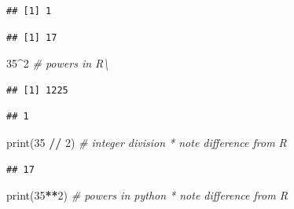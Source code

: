 \documentclass[]{book}
\newenvironment{Shaded}{\begin{snugshade}}{\end{snugshade}}
\newcommand{\DecValTok}[1]{\textcolor[rgb]{0.00,0.00,0.81}{#1}}
\newcommand{\StringTok}[1]{\textcolor[rgb]{0.31,0.60,0.02}{#1}}
\newcommand{\CommentTok}[1]{\textcolor[rgb]{0.56,0.35,0.01}{\textit{#1}}}
\newcommand{\OperatorTok}[1]{\textcolor[rgb]{0.81,0.36,0.00}{\textbf{#1}}}
\newcommand{\BuiltInTok}[1]{#1}
\newcommand{\NormalTok}[1]{#1}
\theoremstyle{definition}
\theoremstyle{definition}
\theoremstyle{definition}
\theoremstyle{remark}
\begin{document}
\begin{verbatim}
## [1] 1
\end{verbatim}

\begin{Shaded}
\end{Shaded}

\begin{verbatim}
## [1] 17
\end{verbatim}

\begin{Shaded}
\begin{Highlighting}[]
\DecValTok{35}\OperatorTok{^}\DecValTok{2}        \CommentTok{# powers in R\textbackslash{}}
\end{Highlighting}
\end{Shaded}

\begin{verbatim}
## [1] 1225
\end{verbatim}

\begin{Shaded}
\end{Shaded}

\begin{verbatim}
## 1
\end{verbatim}

\begin{Shaded}
\begin{Highlighting}[]
\BuiltInTok{print}\NormalTok{(}\DecValTok{35} \OperatorTok{//} \DecValTok{2}\NormalTok{)    }\CommentTok{# integer division       * note difference from R}
\end{Highlighting}
\end{Shaded}

\begin{verbatim}
## 17
\end{verbatim}

\begin{Shaded}
\begin{Highlighting}[]
\BuiltInTok{print}\NormalTok{(}\DecValTok{35}\OperatorTok{**}\DecValTok{2}\NormalTok{)      }\CommentTok{# powers in python     * note difference from R}
\end{Highlighting}
\end{Shaded}
\end{document}
